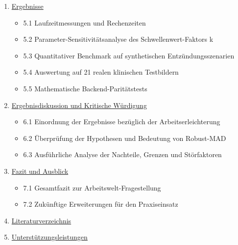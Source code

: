 \documentclass[
  11pt,
]{article}
\providecommand{\tightlist}{%
  \setlength{\itemsep}{0pt}\setlength{\parskip}{0pt}}
\begin{document}
\begin{enumerate}
  \begin{itemize}
  \tightlist
  \item
    4.1 Ausgangsmaterial (Original-Thermogramm)
  \item
    4.2 Körpermaskierung und Distanzkarte (Stufe 2)
  \item
    4.3 Hintergrundkorrektur via Top-Hat-Transformation (Stufe 3)
  \item
    4.4 Statistisches Thresholding und Hotspot-Maske (Stufe 4 \& 5)
  \item
    4.5 Finales diagnostisches Overlay für das Behandlungszimmer
  \item
    4.6 Auswertung synthetischer Krankheits-Szenarien
  \end{itemize}
\item
  \hyperref[5-ergebnisse]{Ergebnisse}

  \begin{itemize}
  \tightlist
  \item
    5.1 Laufzeitmessungen und Rechenzeiten
  \item
    5.2 Parameter-Sensitivitätsanalyse des Schwellenwert-Faktors k
  \item
    5.3 Quantitativer Benchmark auf synthetischen Entzündungsszenarien
  \item
    5.4 Auswertung auf 21 realen klinischen Testbildern
  \item
    5.5 Mathematische Backend-Paritätstests
  \end{itemize}
\item
  \hyperref[6-ergebnisdiskussion-und-kritische-wuxfcrdigung]{Ergebnisdiskussion
  und Kritische Würdigung}

  \begin{itemize}
  \tightlist
  \item
    6.1 Einordnung der Ergebnisse bezüglich der Arbeitserleichterung
  \item
    6.2 Überprüfung der Hypothesen und Bedeutung von Robust-MAD
  \item
    6.3 Ausführliche Analyse der Nachteile, Grenzen und Störfaktoren
  \end{itemize}
\item
  \hyperref[7-fazit-und-ausblick]{Fazit und Ausblick}

  \begin{itemize}
  \tightlist
  \item
    7.1 Gesamtfazit zur Arbeitswelt-Fragestellung
  \item
    7.2 Zukünftige Erweiterungen für den Praxiseinsatz
  \end{itemize}
\item
  \hyperref[8-literaturverzeichnis]{Literaturverzeichnis}
\item
  \hyperref[9-unterstuxfctzungsleistungen]{Unterstützungsleistungen}
\end{enumerate}
\end{document}
